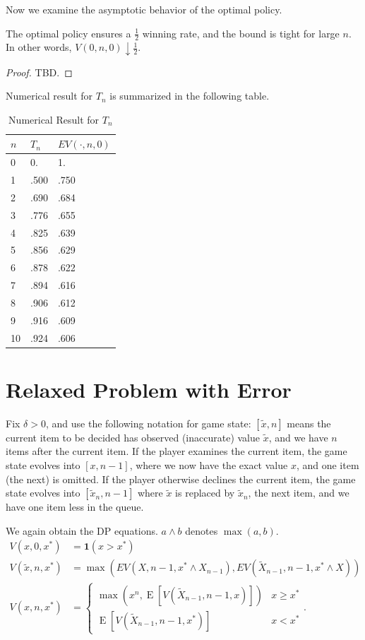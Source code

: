 Now we examine the asymptotic behavior of the optimal policy.

\begin{theorem}
	The optimal policy ensures a $\frac{1}{2}$ winning rate, and the bound is tight for large $n$. In other words, $V(0,n, 0) \downarrow \frac{1}{2}$.
\end{theorem}
\begin{proof}
	TBD.
\end{proof}


Numerical result for $T_n$ is summarized in the following table.

\begin{table}[htpb]
	\centering
	\caption{Numerical Result for  $T_n$}
	\begin{tabular}{l|l|l}
		$n$ & $T_n$ & $EV(\cdot, n, 0)$ \\
		\hline
0 & 0. & 1.\\
1 & .500 & .750\\
2 & .690 & .684\\
3 & .776 & .655\\
4 & .825 & .639\\
5 & .856 & .629\\
6 & .878 & .622\\
7 & .894 & .616\\
8 & .906 & .612\\
9 & .916 & .609\\
10 & .924 & .606 
	\end{tabular}
\end{table}

\section{Relaxed Problem with Error}
Fix $\delta > 0$, and use the following notation for game state: $[\tilde x, n]$ means the current item to be decided has observed (inaccurate) value  $\tilde x$, and we have $n$ items after the current item. 
If the player examines the current item, the game state evolves into $[x, n-1]$, where we now have the exact value $x$, and one item (the next) is omitted. 
If the player otherwise declines the current item, the game state evolves into $[\tilde x_n, n-1]$ where $\tilde x$ is replaced by $\tilde x_n$, the next item, and we have one item less in the queue.

We again obtain the DP equations. $a \wedge b$ denotes $\max(a,b)$.
\begin{align}
	\label{base}
	V(x, 0, x^*) &= \textbf{1}(x>x^*)\\
	\label{err_induct}
	V(\tilde x, n, x^*) &= \max\left( EV(X,n-1, x^* \wedge X_{n-1}), EV(\tilde X_{n-1}, n-1, x^* \wedge X)\right)  \\
	\label{noerr_induct}
	V(x, n, x^*) &=  \begin{cases}
	\max\left( x^n,  \operatorname{E}\left[{V(\tilde X_{n-1}, n-1, x)}\right]\right) &x\ge x^*\\
	\operatorname{E}\left[{V(\tilde X_{n-1}, n-1, x^*)}\right] &x<x^*
	\end{cases}
.\end{align}

